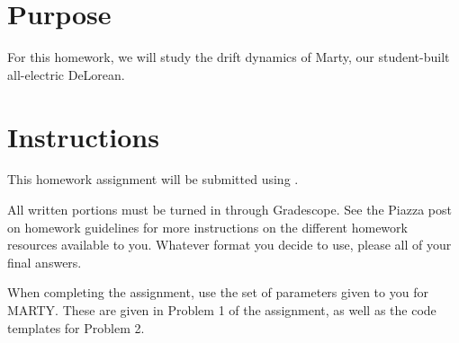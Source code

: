 
\hspace{0.5cm}

\section*{Purpose}

For this homework, we will study the drift dynamics of Marty, our student-built all-electric DeLorean.

\section*{Instructions}

This homework assignment will be submitted using \GSno{}.

All written portions must be turned in through Gradescope. See the Piazza post on homework guidelines for more
instructions on the different homework resources available to you. Whatever format you decide to use, please  all of your final answers.

When completing the assignment, use the set of parameters given to you for MARTY. These are given in Problem 1 of the
assignment, as well as the code templates for Problem 2.


\newpage
